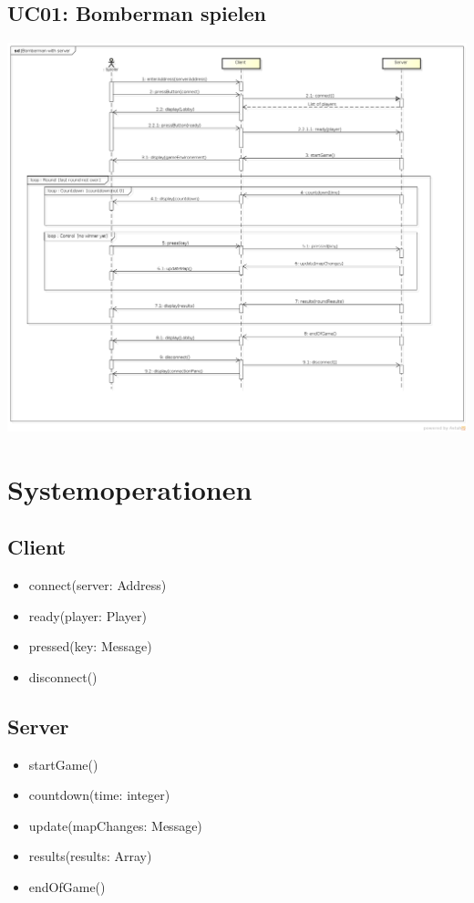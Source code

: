\documentclass[11pt]{scrartcl}
\begin{document}
\subsection{UC01: Bomberman spielen}
\label{sec:UC01: Bomberman spielen}
\begin{center}
\includegraphics[scale=0.3]{SystemSequenzDiagramm_JBomberman} 
\end{center}

\newpage
\section{Systemoperationen}
\label{sec:Systemoperationen}
\subsection{Client}
\begin{itemize}
\item connect(server: Address)
\item ready(player: Player)
\item pressed(key: Message)
\item disconnect()
\end{itemize}

\subsection{Server}
\begin{itemize}
    \item startGame()
    \item countdown(time: integer)
    \item update(mapChanges: Message)
    \item results(results: Array)
    \item endOfGame()
\end{itemize}
\end{document}
